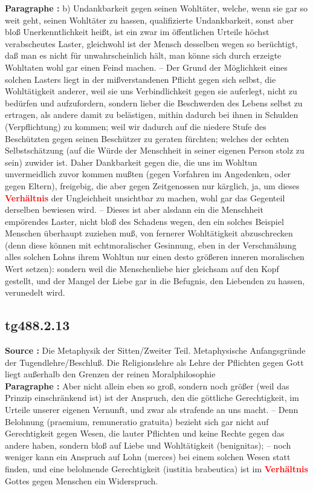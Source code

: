 \documentclass[a4paper,12pt,twoside]{book}
\newcommand{\match}[1]{\textcolor{red}{\textbf{#1}}}
\begin{document}
	\textbf{Paragraphe : }b) Undankbarkeit gegen seinen Wohltäter, welche, wenn sie gar so weit geht, seinen Wohltäter zu hassen, 
	qualifizierte Undankbarkeit, sonst aber bloß Unerkenntlichkeit heißt, ist ein zwar im öffentlichen Urteile höchst verabscheutes Laster, gleichwohl ist der Mensch desselben wegen so berüchtigt, daß man es nicht für unwahrscheinlich hält, man könne sich durch erzeigte Wohltaten wohl gar einen Feind machen. – Der Grund der Möglichkeit eines solchen Lasters liegt in der mißverstandenen Pflicht gegen sich selbst, die Wohltätigkeit anderer, weil sie uns Verbindlichkeit gegen sie auferlegt, nicht zu bedürfen und aufzufordern, sondern lieber die Beschwerden des Lebens selbst zu ertragen, als andere damit zu belästigen, mithin dadurch bei ihnen in Schulden (Verpflichtung) zu kommen; weil wir dadurch auf die niedere Stufe des Beschützten gegen seinen Beschützer zu geraten fürchten; welches der echten Selbstschätzung (auf die Würde der Menschheit in seiner eigenen Person stolz zu sein) zuwider ist. Daher Dankbarkeit gegen die, die uns im Wohltun unvermeidlich zuvor kommen mußten (gegen Vorfahren im Angedenken, oder gegen Eltern), freigebig, die aber gegen Zeitgenossen nur kärglich, ja, um dieses \match{Verhältnis} der Ungleichheit unsichtbar zu machen, wohl gar das Gegenteil derselben bewiesen wird. – Dieses ist aber alsdann ein die Menschheit empörendes Laster, nicht bloß des Schadens wegen, den ein solches Beispiel Menschen überhaupt zuziehen muß, von fernerer Wohltätigkeit abzuschrecken (denn diese können mit echtmoralischer Gesinnung, eben in der Verschmähung alles solchen Lohns ihrem Wohltun nur einen desto größeren inneren moralischen Wert setzen): sondern weil die Menschenliebe hier gleichsam auf den Kopf gestellt, und der Mangel der Liebe gar in die Befugnis, den Liebenden zu hassen, verunedelt wird. 
	
	\subsection*{tg488.2.13} 
	\textbf{Source : }Die Metaphysik der Sitten/Zweiter Teil. Metaphysische Anfangsgründe der Tugendlehre/Beschluß. Die Religionslehre als Lehre der Pflichten gegen Gott liegt außerhalb den Grenzen der reinen Moralphilosophie\\  
	
	\textbf{Paragraphe : }Aber nicht allein eben so groß, sondern noch größer (weil das Prinzip einschränkend ist) ist der Anspruch, den die göttliche Gerechtigkeit, im Urteile unserer eigenen Vernunft, und zwar als strafende an uns macht. – Denn Belohnung (praemium, remuneratio gratuita) bezieht sich gar nicht auf Gerechtigkeit gegen Wesen, die lauter Pflichten und keine Rechte gegen das andere haben, sondern bloß auf Liebe und Wohltätigkeit (benignitas); – noch weniger kann ein Anspruch auf Lohn (merces) bei einem solchen Wesen statt finden, und eine belohnende Gerechtigkeit (iustitia brabeutica) ist im \match{Verhältnis} Gottes gegen Menschen ein Widerspruch. 
	
\end{document}
